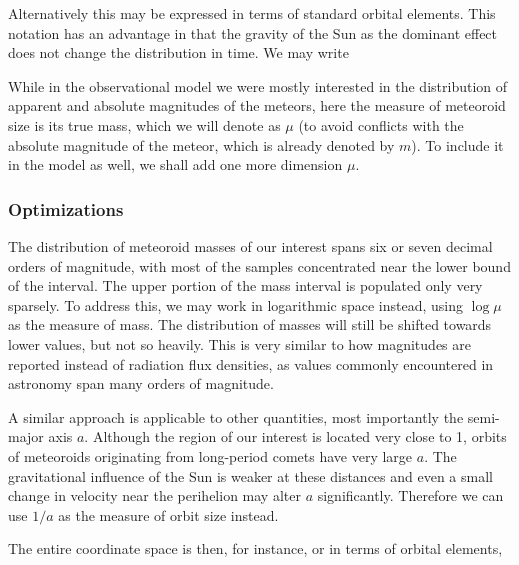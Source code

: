         Alternatively this may be expressed in terms of standard orbital elements.
        This notation has an advantage in that the gravity of the Sun as
        the dominant effect does not change the distribution in time.
        We may write

        While in the observational model we were mostly interested in the distribution of apparent and absolute
        magnitudes of the meteors, here the measure of meteoroid size is its true mass, which we will denote as
        $\mu$ (to avoid conflicts with the absolute magnitude of the meteor, which is already denoted by $m$).
        To include it in the model as well, we shall add one more dimension $\mu$.

        \subsubsection{Optimizations} \label{moco}
            The distribution of meteoroid masses of our interest spans six or seven decimal orders of magnitude,
            with most of the samples concentrated near the lower bound of the interval.
            The upper portion of the mass interval is populated only very sparsely.
            To address this, we may work in logarithmic space instead, using $\log \mu$ as the measure of mass.
            The distribution of masses will still be shifted towards lower values, but not so heavily.
            This is very similar to how magnitudes are reported instead of radiation flux densities, as
            values commonly encountered in astronomy span many orders of magnitude.

            A similar approach is applicable to other quantities, most importantly the semi-major axis $a$.
            Although the region of our interest is located very close to \SI{1}{\au},
            orbits of meteoroids originating from long-period comets have very large $a$.
            The gravitational influence of the Sun is weaker at these distances and
            even a small change in velocity near the perihelion may alter $a$ significantly.
            Therefore we can use $1/a$ as the measure of orbit size instead.

            The entire coordinate space is then, for instance,
            or in terms of orbital elements,

